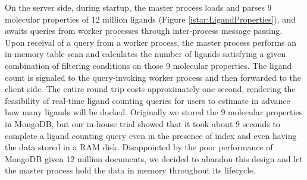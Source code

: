 On the server side, during startup, the master process loads and parses 9 molecular properties of 12 million ligands (Figure \ref{istar:LigandProperties}), and awaits queries from worker processes through inter-process message passing. Upon receival of a query from a worker process, the master process performs an in-memory table scan and calculates the number of ligands satisfying a given combination of filtering conditions on those 9 molecular properties. The ligand count is signaled to the query-invoking worker process and then forwarded to the client side. The entire round trip costs approximately one second, rendering the feasibility of real-time ligand counting queries for users to estimate in advance how many ligands will be docked. Originally we stored the 9 molecular properties in MongoDB, but our in-house trial showed that it took about 9 seconds to complete a ligand counting query even in the presence of index and even having the data stored in a RAM disk. Disappointed by the poor performance of MongoDB given 12 million documents, we decided to abandon this design and let the master process hold the data in memory throughout its lifecycle.

